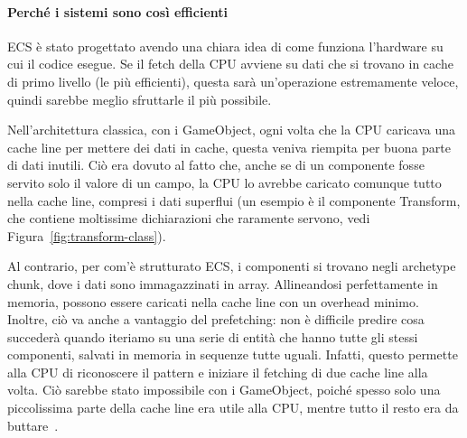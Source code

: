 \paragraph{Perché i sistemi sono così efficienti}
ECS è stato progettato avendo una chiara idea di come funziona l'hardware su cui il codice esegue.
Se il fetch della CPU avviene su dati che si trovano in cache di primo livello (le più efficienti), questa sarà un'operazione estremamente veloce, quindi sarebbe meglio sfruttarle il più possibile.

Nell'architettura classica, con i GameObject, ogni volta che la CPU caricava una cache line per mettere dei dati in cache, questa veniva riempita per buona parte di dati inutili. Ciò era dovuto al fatto che, anche se di un componente fosse servito solo il valore di un campo, la CPU lo avrebbe caricato comunque tutto nella cache line, compresi i dati superflui (un esempio è il componente Transform, che contiene moltissime dichiarazioni che raramente servono, vedi Figura~\ref{fig:transform-class}).

Al contrario, per com'è strutturato ECS, i componenti si trovano negli archetype chunk, dove i dati sono immagazzinati in array. Allineandosi perfettamente in memoria, possono essere caricati nella cache line con un overhead minimo.
Inoltre, ciò va anche a vantaggio del prefetching: non è difficile predire cosa succederà quando iteriamo su una serie di entità che hanno tutte gli stessi componenti, salvati in memoria in sequenze tutte uguali. Infatti, questo permette alla CPU di riconoscere il pattern e iniziare il fetching di due cache line alla volta. Ciò sarebbe stato impossibile con i GameObject, poiché spesso solo una piccolissima parte della cache line era utile alla CPU, mentre tutto il resto era da buttare~\cite{youtube:differenze-unity-classico}.

